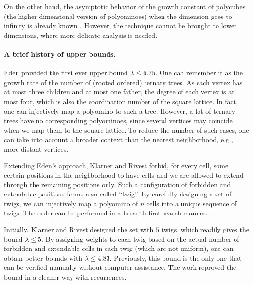 \documentclass[a4paper,12pt]{article}
\begin{document}
On the other hand, the asymptotic behavior of the growth constant of polycubes (the higher dimensional version of polyominoes) when the dimension goes to infinity is already known \cite{barequet2010formulae}. However, the technique cannot be brought to lower dimensions, where more delicate analysis is needed.

\paragraph{A brief history of upper bounds.}
Eden \cite{eden1961two} provided the first ever upper bound $\lambda\le 6.75$. One can remember it as the growth rate of the number of (rooted ordered) ternary trees. As each vertex has at most three children and at most one father, the degree of each vertex is at most four, which is also the coordination number of the square lattice. In fact, one can injectively map a polyomino to such a tree. However, a lot of ternary trees have no corresponding polyominoes, since several vertices may coincide when we map them to the square lattice. To reduce the number of such cases, one can take into account a broader context than the nearest neighborhood, e.g., more distant vertices. 



Extending Eden's approach, Klarner and Rivest \cite{klarner1973procedure} forbid, for every cell, some certain positions in the neighborhood to have cells and we are allowed to extend through the remaining positions only. Such a configuration of forbidden and extendable positions forms a so-called ``twig''. By carefully designing a set of twigs, we can injectively map a polyomino of $n$ cells into a unique sequence of twigs. The order can be performed in a breadth-first-search manner.

Initially, Klarner and Rivest designed the set with $5$ twigs, which readily gives the bound $\lambda\le 5$. By assigning weights to each twig based on the actual number of forbidden and extendable cells in each twig (which are not uniform), one can obtain better bounds with $\lambda\le 4.83$. Previously, this bound is the only one that can be verified manually without computer assistance. The work \cite{bui2025bounding} reproved the bound in a cleaner way with recurrences.
\end{document}
